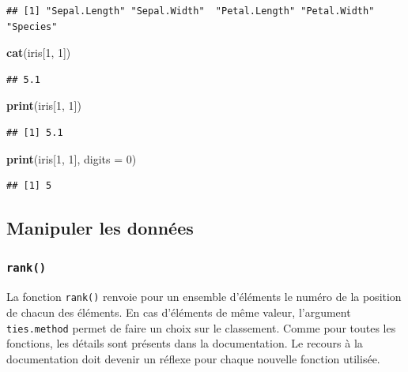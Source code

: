 \documentclass[
]{book}
\newenvironment{Shaded}{\begin{snugshade}}{\end{snugshade}}
\newcommand{\DataTypeTok}[1]{\textcolor[rgb]{0.13,0.29,0.53}{#1}}
\newcommand{\DecValTok}[1]{\textcolor[rgb]{0.00,0.00,0.81}{#1}}
\newcommand{\KeywordTok}[1]{\textcolor[rgb]{0.13,0.29,0.53}{\textbf{#1}}}
\newcommand{\NormalTok}[1]{#1}
\begin{document}
\begin{verbatim}
## [1] "Sepal.Length" "Sepal.Width"  "Petal.Length" "Petal.Width"  "Species"
\end{verbatim}

\begin{Shaded}
\begin{Highlighting}[]
\KeywordTok{cat}\NormalTok{(iris[}\DecValTok{1}\NormalTok{, }\DecValTok{1}\NormalTok{])}
\end{Highlighting}
\end{Shaded}

\begin{verbatim}
## 5.1
\end{verbatim}

\begin{Shaded}
\begin{Highlighting}[]
\KeywordTok{print}\NormalTok{(iris[}\DecValTok{1}\NormalTok{, }\DecValTok{1}\NormalTok{])}
\end{Highlighting}
\end{Shaded}

\begin{verbatim}
## [1] 5.1
\end{verbatim}

\begin{Shaded}
\begin{Highlighting}[]
\KeywordTok{print}\NormalTok{(iris[}\DecValTok{1}\NormalTok{, }\DecValTok{1}\NormalTok{], }\DataTypeTok{digits =} \DecValTok{0}\NormalTok{)}
\end{Highlighting}
\end{Shaded}

\begin{verbatim}
## [1] 5
\end{verbatim}

\hypertarget{manipuler-les-donnuxe9es}{%
\subsection{Manipuler les données}\label{manipuler-les-donnuxe9es}}

\hypertarget{l015rank}{%
\subsubsection{\texorpdfstring{\texttt{rank()}}{rank()}}\label{l015rank}}

La fonction \texttt{rank()} renvoie pour un ensemble d'éléments le numéro de la position de chacun des éléments. En cas d'éléments de même valeur, l'argument \texttt{ties.method} permet de faire un choix sur le classement. Comme pour toutes les fonctions, les détails sont présents dans la documentation. Le recours à la documentation doit devenir un réflexe pour chaque nouvelle fonction utilisée.
\end{document}
